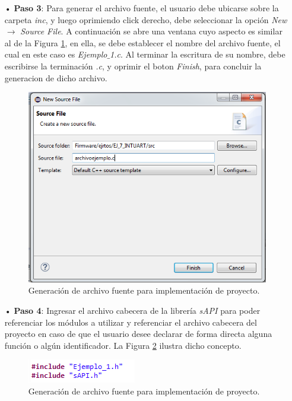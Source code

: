 \documentclass[12pt,letterpaper]{article}
\begin{document}
\begin{enumerate}
\item[•]\textbf{Paso 3}: Para generar el archivo fuente, el usuario debe ubicarse sobre la carpeta \textit{inc}, y luego oprimiendo click derecho, debe seleccionar la opción \textit{New} $\rightarrow$ \textit{Source File}. A continuación se abre una ventana cuyo aspecto es similar al de la Figura \ref{archivofuentesapi1}, en ella, se debe establecer el nombre del archivo fuente, el cual en este caso es \textit{Ejemplo$\_$1.c}. Al terminar la escritura de su nombre, debe escribirse la terminación \textit{.c}, y oprimir el boton \textit{Finish}, para concluir la generacion de dicho archivo.
\begin{figure}[!h]
\centering
\includegraphics[width=8 cm]{figuras/f28.png}
\caption{Generación de archivo fuente para implementación de proyecto.}
\label{archivofuentesapi1}
\end{figure}
\item[•]\textbf{Paso 4}: Ingresar el archivo cabecera de la librería \textit{sAPI} para poder referenciar los módulos a utilizar y referenciar el archivo cabecera del proyecto en caso de que el usuario desee declarar de forma directa alguna función o algún identificador. La Figura \ref{inclusionsapi1} ilustra dicho concepto.

\begin{figure}[!h]
\centering
\includegraphics[width=5 cm]{figuras/f2.png}
\caption{Generación de archivo fuente para implementación de proyecto.}
\label{inclusionsapi1}
\end{figure}


\end{enumerate}
\end{document}

